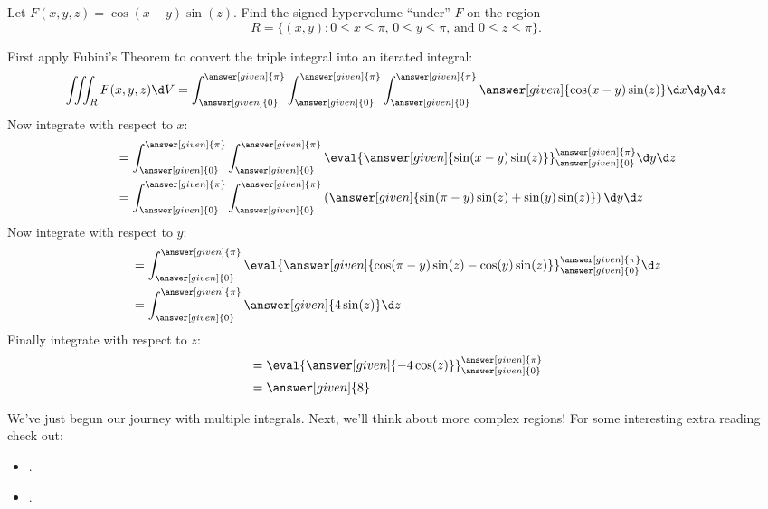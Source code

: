 \documentclass{ximera}
\begin{document}
\begin{example}
  Let $F(x,y,z) = \cos(x-y)\sin(z)$. Find the signed hypervolume ``under'' $F$ on the region
  \[
  R = \{(x,y):\text{$0\le x\le \pi$, $0\le y\le \pi$, and $0\le z\le \pi$}\}.
  \]
  \begin{explanation}
    First apply Fubini's Theorem to convert the triple integral into an iterated integral:
    \[
    \iiint_R F(x,y,z) \d V =\int_{\answer[given]{0}}^{\answer[given]{\pi}}\int_{\answer[given]{0}}^{\answer[given]{\pi}}\int_{\answer[given]{0}}^{\answer[given]{\pi}} \answer[given]{\cos(x-y)\sin(z)} \d x \d y \d z
    \]
    Now integrate with respect to $x$:
    \begin{align*}
      &= \int_{\answer[given]{0}}^{\answer[given]{\pi}}\int_{\answer[given]{0}}^{\answer[given]{\pi}}\eval{\answer[given]{\sin(x-y)\sin(z)}}_{\answer[given]{0}}^{\answer[given]{\pi}}\d y \d z \\
      &= \int_{\answer[given]{0}}^{\answer[given]{\pi}}\int_{\answer[given]{0}}^{\answer[given]{\pi}}\left(\answer[given]{\sin(\pi-y)\sin(z) + \sin(y)\sin(z)}\right)\d y \d z 
    \end{align*}
    Now integrate with respect to $y$:
    \begin{align*}
      &= \int_{\answer[given]{0}}^{\answer[given]{\pi}}\eval{\answer[given]{\cos(\pi-y)\sin(z) -\cos(y)\sin(z)}}_{\answer[given]{0}}^{\answer[given]{\pi}} \d z\\
      &= \int_{\answer[given]{0}}^{\answer[given]{\pi}}\answer[given]{4\sin(z)} \d z
    \end{align*}
    Finally integrate with respect to $z$:
    \begin{align*}
      &= \eval{\answer[given]{-4\cos(z)}}_{\answer[given]{0}}^{\answer[given]{\pi}} \\
      &= \answer[given]{8}
    \end{align*}
  \end{explanation}
\end{example}

We've just begun our journey with multiple integrals. Next, we'll think about
more complex regions! For some interesting extra reading check out:
\begin{itemize}
\item {}.
\item {}.
\end{itemize}
\end{document}

